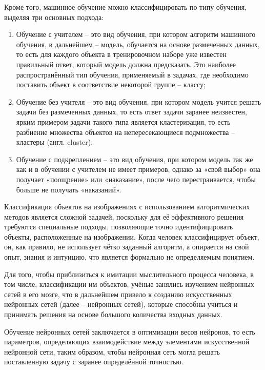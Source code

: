\documentclass[14pt, russian]{scrartcl}
\begin{document}
Кроме того, машинное обучение можно классифицировать по типу обучения, выделяя три основных подхода:
\begin{enumerate}
    \item Обучение с учителем -- это вид обучения, при котором алгоритм машинного обучения, в дальнейшем -- модель, обучается на основе размеченных данных, то есть для каждого объекта в тренировочном наборе уже известен правильный ответ, который модель должна предсказать. Это наиболее распространённый тип обучения, применяемый в задачах, где необходимо поставить объект в соответствие некоторой группе -- классу;
    \item Обучение без учителя -- это вид обучения, при котором модель учится решать задачи без размеченных данных, то есть ответ задачи заранее неизвестен, ярким примером задачи такого типа является кластеризация, то есть разбиение множества объектов на непересекающиеся подмножества -- кластеры (англ. cluster);
    \item Обучение с подкреплением -- это вид обучения, при котором модель так же как и в обучении с учителем не имеет примеров, однако за «свой выбор» она получает «поощрение» или «наказание», после чего перестраивается, чтобы больше не получать «наказаний».
\end{enumerate}

Классификация объектов на изображениях с использованием алгоритмических методов является сложной задачей, поскольку для её эффективного решения требуются специальные подходы, позволяющие точно идентифицировать объекты, расположенные на изображении. Когда человек классифицирует объект, он, как правило, не использует чётко заданный алгоритм, а опирается на свой опыт, знания и интуицию, что является формально не определяемым понятием.

Для того, чтобы приблизиться к имитации мыслительного процесса человека, в том числе, классификации им объектов, учёные занялись изучением нейронных сетей в его мозге, что в дальнейшем привело к созданию искусственных нейронных сетей (далее -- нейронных сетей), которые способны учиться и принимать решения на основе большого количества входных данных.

Обучение нейронных сетей заключается в оптимизации весов нейронов, то есть параметров, определяющих взаимодействие между элементами искусственной нейронной сети, таким образом, чтобы нейронная сеть могла решать поставленную задачу с заранее определённой точностью.

\end{document}
